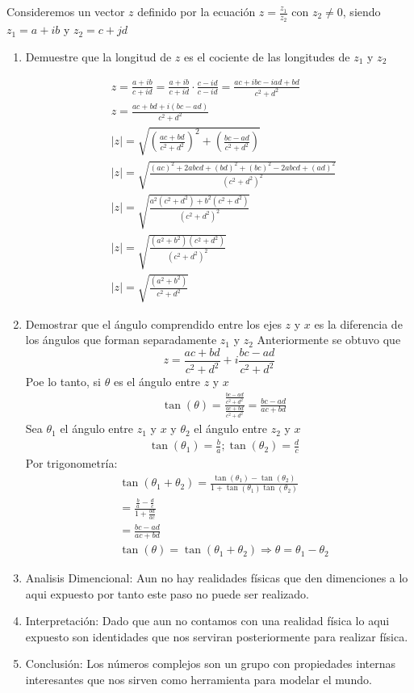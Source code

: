 \documentclass[12pt]{exam}
\begin{document}
Consideremos un vector $z$ definido por la ecuación $z=\frac{z_1}{z_2}$ con $z_2\neq 0$, siendo $z_1 = a + ib$ y $z_2 = c + jd$
\begin{enumerate}
	\item Demuestre que la longitud de $z$ es el cociente de las longitudes de $z_1$ y $z_2$

		\begin{align*}
			& z = \frac{a+ib}{c+id} = \frac{a+ib}{c+id} \cdot \frac{c-id}{c-id} = \frac{ac+ ibc - iad + bd}{c^2 + d^2}\\
			& z = \frac{ac+bd+i(bc-ad)}{c^2 + d^2}\\
			& |z| = \sqrt{\left(\frac{ac+bd}{c^2+d^2}\right)^2 + \left(\frac{bc-ad}{c^2+d^2}\right)}\\
			& |z| = \sqrt{\frac{(ac)^2 + 2abcd + (bd)^2 + (bc)^2 - 2abcd + (ad)^2}{(c^2+d^2)^2}}\\
			& |z| = \sqrt{\frac{a^2(c^2+d^2)+b^2(c^2+d^2)}{(c^2+d^2)^2}}\\
			& |z| = \sqrt{\frac{(a^2+b^2)(c^2+d^2)}{(c^2+d^2)^2}}\\
			& |z| = \sqrt{\frac{(a^2+b^2)}{c^2+d^2}}
		\end{align*}
	\item Demostrar que el ángulo comprendido entre los ejes $z$ y $x$ es la diferencia de los ángulos que forman separadamente $z_1$ y $z_2$
		Anteriormente se obtuvo que
		$$z = \frac{ac+bd}{c^2+d^2} + i\frac{bc-ad}{c^2+d^2}$$
		Poe lo tanto, si $\theta$ es el ángulo entre $z$ y $x$
		\begin{align*}
			&\tan(\theta) = \frac{\frac{bc-ad}{c^2+d^2}}{\frac{ac+bd}{c^2+d^2}} = \frac{bc-ad}{ac+bd}
		\end{align*}
		Sea $\theta_1$ el ángulo entre $z_1$ y $x$ y $\theta_2$ el ángulo entre $z_2$ y $x$
		\begin{align*}
			&\tan(\theta_1) = \frac{b}{a} ; \tan(\theta_2)=\frac{d}{c}
		\end{align*}
		Por trigonometría:
		\begin{align*}
			&\tan(\theta_1 + \theta_2) = \frac{\tan(\theta_1)-\tan(\theta_2)}{1+\tan(\theta_1)\tan(\theta_2)}\\
			& = \frac{\frac{b}{a}-\frac{d}{c}}{1+\frac{bd}{ac}}\\
			& = \frac{bc-ad}{ac+bd}\\
			& \tan(\theta) = \tan(\theta_1 + \theta_2) \Rightarrow \theta = \theta_1 - \theta_2
		\end{align*}
	\item Analisis Dimencional: Aun no hay realidades físicas que den dimenciones a lo aqui expuesto por tanto este paso no puede ser realizado.
	\item Interpretación: Dado que aun no contamos con una realidad física lo aqui expuesto son identidades que nos serviran posteriormente para realizar física.
	\item Conclusión: Los números complejos son un grupo con propiedades internas interesantes que nos sirven como herramienta para modelar el mundo.
\end{enumerate}
\end{document}

